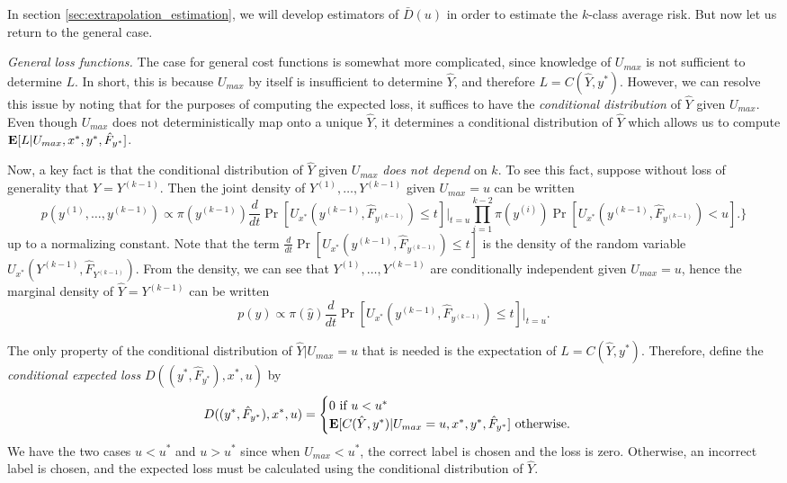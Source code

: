 In section \ref{sec:extrapolation_estimation}, we will develop
estimators of $\bar{D}(u)$ in order to estimate the $k$-class average
risk.  But now let us return to the general case.
\newline

\noindent \emph{General loss functions.}
The case for general cost functions is somewhat more complicated,
since knowledge of $U_{max}$ is not sufficient to determine $L$.  In
short, this is because $U_{max}$ by itself is insufficient to
determine $\hat{Y}$, and therefore $L=C(\hat{Y}, y^*)$.  However, we
can resolve this issue by noting that for the purposes of computing
the expected loss, it suffices to have the \emph{conditional
distribution} of $\hat{Y}$ given $U_{max}$.  Even though $U_{max}$
does not deterministically map onto a unique $\hat{Y}$, it determines
a conditional distribution of $\hat{Y}$ which allows us to compute
$\textbf{E}[L|U_{max}, x^*, y^*, \hat{F}_{y^*}]$.

Now, a key fact is that the conditional distribution of $\hat{Y}$
given $U_{max}$ \emph{does not depend} on $k$.  To see this fact,
suppose without loss of generality that $\hat{Y} = Y^{(k-1)}.$ Then
the joint density of $Y^{(1)},\hdots, Y^{(k-1)}$ given $U_{max} =
u$ can be written
\[
p(y^{(1)},\hdots, y^{(k-1)}) \propto 
\pi(y^{(k-1)})\frac{d}{dt}\Pr[U_{x^*}(y^{(k-1)}, \hat{F}_{y^{(k-1)}}) \leq t]|_{t=u}
\prod_{i=1}^{k-2}\pi(y^{(i)})\Pr[U_{x^*}(y^{(k-1)}, \hat{F}_{y^{(k-1)}}) < u].
\}
\]
up to a normalizing constant.  Note that the term
$\frac{d}{dt}\Pr[U_{x^*}(y^{(k-1)}, \hat{F}_{y^{(k-1)}}) \leq t]$ is the
density of the random variable
$U_{x^*}(Y^{(k-1)}, \hat{F}_{Y^{(k-1)}})$. From the density, we can see
that $Y^{(1)},\hdots, Y^{(k-1)}$ are conditionally independent given
$U_{max} = u$, hence the marginal density of $\hat{Y}=Y^{(k-1)}$ can
be written
\[
p(\hat{y}) \propto \pi(\hat{y})\frac{d}{dt}\Pr[U_{x^*}(y^{(k-1)}, \hat{F}_{y^{(k-1)}}) \leq t]|_{t=u}.
\]

The only property of the conditional distribution of $\hat{Y}|U_{max} = u$ that is needed is
the expectation of $L = C(\hat{Y}, y^*)$.  Therefore, define the \emph{conditional expected loss} $D((y^*, \hat{F}_{y^*}), x^*, u)$ by
\begin{equation}\label{eq:Kfunc}
D((y^*, \hat{F}_{y^*}), x^*, u) = \begin{cases} 0 \text{ if } u < u^*\\
\textbf{E}[C(\hat{Y}, y^*)|U_{max} = u, x^*, y^*, \hat{F}_{y^*}] \text{ otherwise.}
\end{cases}
\end{equation}
We have the two cases $u < u^*$ and $u > u^*$ since when $U_{max} <
u^*$, the correct label is chosen and the loss is zero.  Otherwise, an
incorrect label is chosen, and the expected loss must be calculated
using the conditional distribution of $\hat{Y}$.

